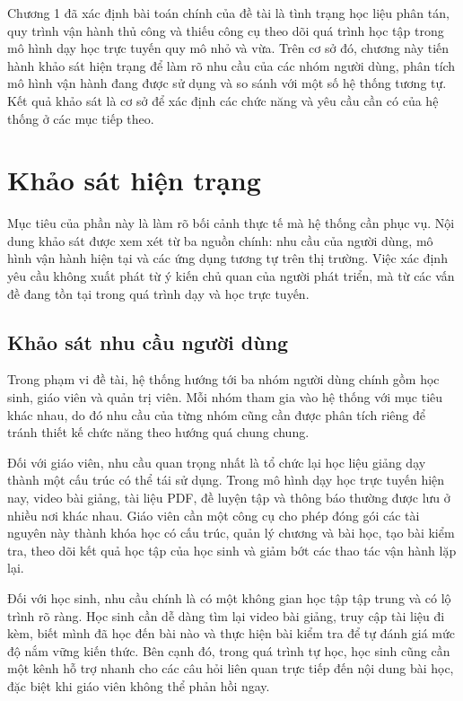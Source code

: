﻿\documentclass[../DoAn.tex]{subfiles}
\begin{document}
\setcounter{chapter}{2}

Chương 1 đã xác định bài toán chính của đề tài là tình trạng học liệu phân tán, quy trình vận hành thủ công và thiếu công cụ theo dõi quá trình học tập trong mô hình dạy học trực tuyến quy mô nhỏ và vừa. Trên cơ sở đó, chương này tiến hành khảo sát hiện trạng để làm rõ nhu cầu của các nhóm người dùng, phân tích mô hình vận hành đang được sử dụng và so sánh với một số hệ thống tương tự. Kết quả khảo sát là cơ sở để xác định các chức năng và yêu cầu cần có của hệ thống ở các mục tiếp theo.

\section{Khảo sát hiện trạng}
\label{section:2.1}

Mục tiêu của phần này là làm rõ bối cảnh thực tế mà hệ thống cần phục vụ. Nội dung khảo sát được xem xét từ ba nguồn chính: nhu cầu của người dùng, mô hình vận hành hiện tại và các ứng dụng tương tự trên thị trường. Việc xác định yêu cầu không xuất phát từ ý kiến chủ quan của người phát triển, mà từ các vấn đề đang tồn tại trong quá trình dạy và học trực tuyến.

\subsection{Khảo sát nhu cầu người dùng}
\label{subsection:2.1.1}

Trong phạm vi đề tài, hệ thống hướng tới ba nhóm người dùng chính gồm học sinh, giáo viên và quản trị viên. Mỗi nhóm tham gia vào hệ thống với mục tiêu khác nhau, do đó nhu cầu của từng nhóm cũng cần được phân tích riêng để tránh thiết kế chức năng theo hướng quá chung chung.

Đối với giáo viên, nhu cầu quan trọng nhất là tổ chức lại học liệu giảng dạy thành một cấu trúc có thể tái sử dụng. Trong mô hình dạy học trực tuyến hiện nay, video bài giảng, tài liệu PDF, đề luyện tập và thông báo thường được lưu ở nhiều nơi khác nhau. Giáo viên cần một công cụ cho phép đóng gói các tài nguyên này thành khóa học có cấu trúc, quản lý chương và bài học, tạo bài kiểm tra, theo dõi kết quả học tập của học sinh và giảm bớt các thao tác vận hành lặp lại.

Đối với học sinh, nhu cầu chính là có một không gian học tập tập trung và có lộ trình rõ ràng. Học sinh cần dễ dàng tìm lại video bài giảng, truy cập tài liệu đi kèm, biết mình đã học đến bài nào và thực hiện bài kiểm tra để tự đánh giá mức độ nắm vững kiến thức. Bên cạnh đó, trong quá trình tự học, học sinh cũng cần một kênh hỗ trợ nhanh cho các câu hỏi liên quan trực tiếp đến nội dung bài học, đặc biệt khi giáo viên không thể phản hồi ngay.
\end{document}
